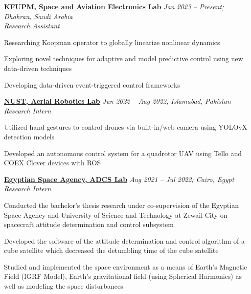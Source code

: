 \href{https://www.kfupm.edu.sa}{\textbf{KFUPM, Space and Aviation Electronics Lab}}
\hfill {\textit{Jan 2023 – Present; Dhahran, Saudi Arabia}}\\
\textit{Research Assistant}\\
\vspace{-0.5cm}
\begin{innerlist}
    \item Researching Koopman operator to globally linearize nonlinear dynamics
    \item Exploring novel techniques for adaptive and model predictive control using new data-driven techniques
    \item Developing data-driven event-triggered control frameworks
\end{innerlist}

\href{https://www.nust.edu.pk}{\textbf{NUST, Aerial Robotics Lab}}
\hfill {\textit{Jun 2022 – Aug 2022; Islamabad, Pakistan}}\\
\textit{Research Intern}\\
\vspace{-0.5cm}
\begin{innerlist}
    \item Utilized hand gestures to control drones via built-in/web camera using YOLOvX detection models
    \item Developed an autonomous control system for a quadrotor UAV using Tello and COEX Clover devices with ROS
\end{innerlist}

\href{https://www.egsa.gov.eg}{\textbf{Egyptian Space Agency, ADCS Lab}}
\hfill {\textit{Aug 2021 – Jul 2022; Cairo, Egypt}}\\
\textit{Research Intern}\\
\vspace{-0.5cm}
\begin{innerlist}
\item  Conducted the bachelor’s thesis research under co-supervision of the Egyptian Space Agency and University of Science and Technology at Zewail City on spacecraft attitude determination and control subsystem
\item Developed the software of the attitude determination and control algorithm of a cube satellite which decreased the detumbling time of the cube satellite
\item  Studied and implemented the space environment as a means of Earth’s Magnetic Field (IGRF Model), Earth’s gravitational field (using Spherical Harmonics) as well as modeling the space disturbances
\end{innerlist}